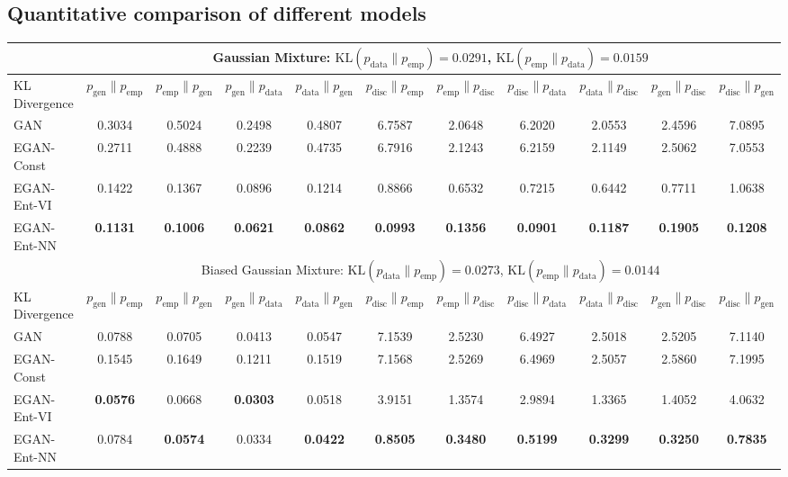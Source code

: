 \documentclass[a4paper]{article}
\newcommand{\pd}{p_\text{data}}
\newcommand{\pg}{p_\text{gen}}
\begin{document}
\subsection{Quantitative comparison of different models}
\label{sec:quantify_synthetic}
\setlength\tabcolsep{3pt}
\begin{table}[h]
\scriptsize
\centering
\begin{tabular}{l|cccc|cccc|cc}
\toprule
& \multicolumn{10}{c}{Gaussian Mixture: \quad $\text{KL}(\pd \| p_\text{emp}) = 0.0291$, \quad $\text{KL}(p_\text{emp} \| \pd) = 0.0159$} \\
\midrule
KL Divergence & $\pg \| p_\text{emp}$ & $p_\text{emp} \| \pg$ & $\pg \| \pd$ & $\pd \| \pg$ & $p_\text{disc} \| p_\text{emp}$ & $p_\text{emp} \| p_\text{disc}$ & $p_\text{disc} \| \pd$ & $\pd \| p_\text{disc}$ & $\pg \| p_\text{disc}$ & $p_\text{disc} \| \pg$ \\
\midrule
GAN         & 0.3034 & 0.5024 & 0.2498 & 0.4807 & 6.7587 & 2.0648 & 6.2020 & 2.0553 & 2.4596 & 7.0895 \\
EGAN-Const  & 0.2711 & 0.4888 & 0.2239 & 0.4735 & 6.7916 & 2.1243 & 6.2159 & 2.1149 & 2.5062 & 7.0553 \\
EGAN-Ent-VI & 0.1422 & 0.1367 & 0.0896 & 0.1214 & 0.8866 & 0.6532 & 0.7215 & 0.6442 & 0.7711 & 1.0638 \\
EGAN-Ent-NN & \textbf{0.1131} & \textbf{0.1006} & \textbf{0.0621} & \textbf{0.0862} & \textbf{0.0993} & \textbf{0.1356} & \textbf{0.0901}   & \textbf{0.1187} & \textbf{0.1905} & \textbf{0.1208} \\
\bottomrule \toprule
& \multicolumn{10}{c}{Biased Gaussian Mixture: \quad $\text{KL}(\pd \| p_\text{emp}) = 0.0273$, \quad $\text{KL}(p_\text{emp} \| \pd) = 0.0144$} \\
\midrule
KL Divergence & $\pg \| p_\text{emp}$ & $p_\text{emp} \| \pg$ & $\pg \| \pd$ & $\pd \| \pg$ & $p_\text{disc} \| p_\text{emp}$ & $p_\text{emp} \| p_\text{disc}$ & $p_\text{disc} \| \pd$ & $\pd \| p_\text{disc}$ & $\pg \| p_\text{disc}$ & $p_\text{disc} \| \pg$ \\
\midrule
GAN         & 0.0788 & 0.0705 & 0.0413 & 0.0547 & 7.1539 & 2.5230 & 6.4927 & 2.5018 & 2.5205 & 7.1140 \\
EGAN-Const  & 0.1545 & 0.1649 & 0.1211 & 0.1519 & 7.1568 & 2.5269 & 6.4969 & 2.5057 & 2.5860 & 7.1995 \\
EGAN-Ent-VI & \textbf{0.0576} & 0.0668 & \textbf{0.0303} & 0.0518 & 3.9151 & 1.3574 & 2.9894 & 1.3365 & 1.4052 & 4.0632 \\
EGAN-Ent-NN & 0.0784 & \textbf{0.0574} & 0.0334 & \textbf{0.0422} & \textbf{0.8505} & \textbf{0.3480} & \textbf{0.5199} & \textbf{0.3299} & \textbf{0.3250} & \textbf{0.7835} \\

\end{tabular}
\end{table}
\end{document}

